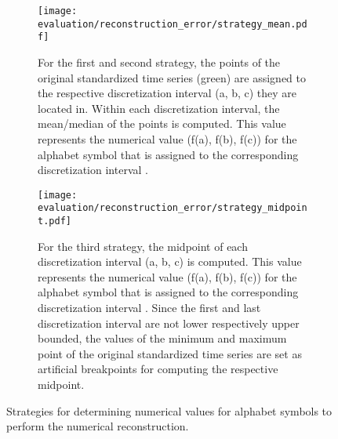 \begin{figure}
\centering
\begin{subfigure}[t]{0.45\textwidth}
\texttt{[image: evaluation/reconstruction\_error/strategy\_mean.pdf]}
\caption{For the first and second strategy, the points of the original standardized time series (green) are assigned to the respective discretization interval (a, b, c) they are located in. Within each discretization interval, the mean/median of the points is computed. This value represents the numerical value (f(a), f(b), f(c)) for the alphabet symbol that is assigned to the corresponding discretization interval \cite{Comparison_SAX}.}
\label{fig:strategy_mean}
\end{subfigure}
\hfill%
\begin{subfigure}[t]{0.45\textwidth}
\texttt{[image: evaluation/reconstruction\_error/strategy\_midpoint.pdf]}
\caption{For the third strategy, the midpoint of each discretization interval (a, b, c) is computed. This value represents the numerical value (f(a), f(b), f(c)) for the alphabet symbol that is assigned to the corresponding discretization interval \cite{Survey_Temporal_Discretization}. Since the first and last discretization interval are not lower respectively upper bounded, the values of the minimum and maximum point of the original standardized time series are set as artificial breakpoints for computing the respective midpoint.}
\label{fig:strategy_midpoint}
\end{subfigure}
\caption[Reconstruction Error - Numerical Values for Alphabet Symbols]{Strategies for determining numerical values for alphabet symbols to perform the numerical reconstruction.}
\label{fig:function_strategies}
\end{figure}
